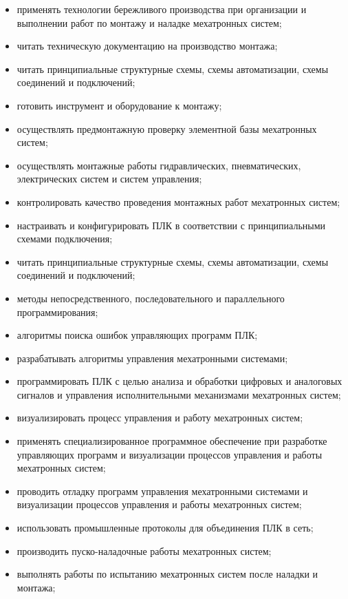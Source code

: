 \begin{itemize}
    \item применять технологии бережливого производства при организации и выполнении работ по монтажу и наладке мехатронных систем;
    \item читать техническую документацию на производство монтажа;
    \item читать принципиальные структурные схемы, схемы автоматизации, схемы соединений и подключений;
    \item готовить инструмент и оборудование к монтажу;
    \item осуществлять предмонтажную проверку элементной базы мехатронных систем;
    \item осуществлять монтажные работы гидравлических, пневматических, электрических систем и систем управления;
    \item контролировать качество проведения монтажных работ мехатронных систем;
    \item настраивать и конфигурировать ПЛК в соответствии с принципиальными схемами подключения;
    \item читать принципиальные структурные схемы, схемы автоматизации, схемы соединений и подключений;
    \item методы непосредственного, последовательного и параллельного программирования;
    \item алгоритмы поиска ошибок управляющих программ ПЛК;
    \item разрабатывать алгоритмы управления мехатронными системами;
    \item программировать ПЛК с целью анализа и обработки цифровых и аналоговых сигналов и управления исполнительными механизмами мехатронных систем;
    \item визуализировать процесс управления и работу мехатронных систем;
    \item применять специализированное программное обеспечение при разработке управляющих программ и визуализации процессов управления и работы мехатронных систем;
    \item проводить отладку программ управления мехатронными системами и визуализации процессов управления и работы мехатронных систем;
    \item использовать промышленные протоколы для объединения ПЛК в сеть;
    \item производить пуско-наладочные работы мехатронных систем;
    \item выполнять работы по испытанию мехатронных систем после наладки и монтажа;

\end{itemize}
